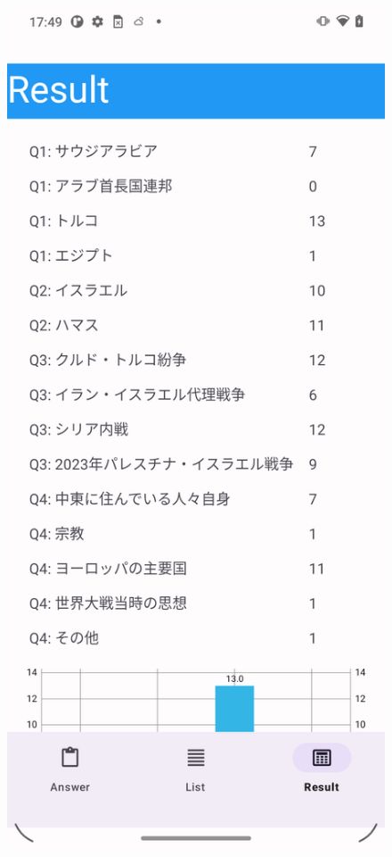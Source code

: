 \documentclass[titlepage,a4paper]{jsarticle}
\begin{document}
\begin{figure}[H]
  \vspace{0.5cm} %

  \begin{minipage}[t]{0.3\textwidth}
    \centering
    \includegraphics[height=0.4\textheight]{img/move/app3.png}

\end{minipage}
\end{figure}
\end{document}
